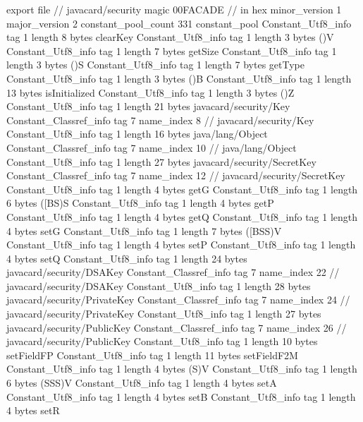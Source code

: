 export file {		// javacard/security
	magic	00FACADE		 // in hex
	minor_version	1
	major_version	2
	constant_pool_count	331
	constant_pool {
		Constant_Utf8_info {
			tag	1
			length	8
			bytes	clearKey
		}
		Constant_Utf8_info {
			tag	1
			length	3
			bytes	()V
		}
		Constant_Utf8_info {
			tag	1
			length	7
			bytes	getSize
		}
		Constant_Utf8_info {
			tag	1
			length	3
			bytes	()S
		}
		Constant_Utf8_info {
			tag	1
			length	7
			bytes	getType
		}
		Constant_Utf8_info {
			tag	1
			length	3
			bytes	()B
		}
		Constant_Utf8_info {
			tag	1
			length	13
			bytes	isInitialized
		}
		Constant_Utf8_info {
			tag	1
			length	3
			bytes	()Z
		}
		Constant_Utf8_info {
			tag	1
			length	21
			bytes	javacard/security/Key
		}
		Constant_Classref_info {
			tag	7
			name_index	8		// javacard/security/Key
		}
		Constant_Utf8_info {
			tag	1
			length	16
			bytes	java/lang/Object
		}
		Constant_Classref_info {
			tag	7
			name_index	10		// java/lang/Object
		}
		Constant_Utf8_info {
			tag	1
			length	27
			bytes	javacard/security/SecretKey
		}
		Constant_Classref_info {
			tag	7
			name_index	12		// javacard/security/SecretKey
		}
		Constant_Utf8_info {
			tag	1
			length	4
			bytes	getG
		}
		Constant_Utf8_info {
			tag	1
			length	6
			bytes	([BS)S
		}
		Constant_Utf8_info {
			tag	1
			length	4
			bytes	getP
		}
		Constant_Utf8_info {
			tag	1
			length	4
			bytes	getQ
		}
		Constant_Utf8_info {
			tag	1
			length	4
			bytes	setG
		}
		Constant_Utf8_info {
			tag	1
			length	7
			bytes	([BSS)V
		}
		Constant_Utf8_info {
			tag	1
			length	4
			bytes	setP
		}
		Constant_Utf8_info {
			tag	1
			length	4
			bytes	setQ
		}
		Constant_Utf8_info {
			tag	1
			length	24
			bytes	javacard/security/DSAKey
		}
		Constant_Classref_info {
			tag	7
			name_index	22		// javacard/security/DSAKey
		}
		Constant_Utf8_info {
			tag	1
			length	28
			bytes	javacard/security/PrivateKey
		}
		Constant_Classref_info {
			tag	7
			name_index	24		// javacard/security/PrivateKey
		}
		Constant_Utf8_info {
			tag	1
			length	27
			bytes	javacard/security/PublicKey
		}
		Constant_Classref_info {
			tag	7
			name_index	26		// javacard/security/PublicKey
		}
		Constant_Utf8_info {
			tag	1
			length	10
			bytes	setFieldFP
		}
		Constant_Utf8_info {
			tag	1
			length	11
			bytes	setFieldF2M
		}
		Constant_Utf8_info {
			tag	1
			length	4
			bytes	(S)V
		}
		Constant_Utf8_info {
			tag	1
			length	6
			bytes	(SSS)V
		}
		Constant_Utf8_info {
			tag	1
			length	4
			bytes	setA
		}
		Constant_Utf8_info {
			tag	1
			length	4
			bytes	setB
		}
		Constant_Utf8_info {
			tag	1
			length	4
			bytes	setR
}}}
